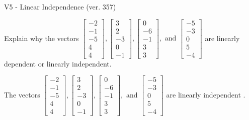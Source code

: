 \begin{exercise}
  \begin{exerciseTitle}V5 - Linear Independence (ver. 357)\end{exerciseTitle}
  \begin{exerciseStatement}
    Explain why the vectors \(\left[\begin{array}{r}
-2 \\
-1 \\
-5 \\
4 \\
4
\end{array}\right] , \left[\begin{array}{r}
3 \\
2 \\
-3 \\
0 \\
-1
\end{array}\right] , \left[\begin{array}{r}
0 \\
-6 \\
-1 \\
3 \\
3
\end{array}\right] , \text{ and } \left[\begin{array}{r}
-5 \\
-3 \\
0 \\
5 \\
-4
\end{array}\right]\) are linearly dependent or linearly independent.	


  \end{exerciseStatement}
  \begin{exerciseAnswer}
   The vectors \(\left[\begin{array}{r}
-2 \\
-1 \\
-5 \\
4 \\
4
\end{array}\right] , \left[\begin{array}{r}
3 \\
2 \\
-3 \\
0 \\
-1
\end{array}\right] , \left[\begin{array}{r}
0 \\
-6 \\
-1 \\
3 \\
3
\end{array}\right] , \text{ and } \left[\begin{array}{r}
-5 \\
-3 \\
0 \\
5 \\
-4
\end{array}\right]\) are 
  	 linearly independent  .
  


  \end{exerciseAnswer}
\end{exercise}